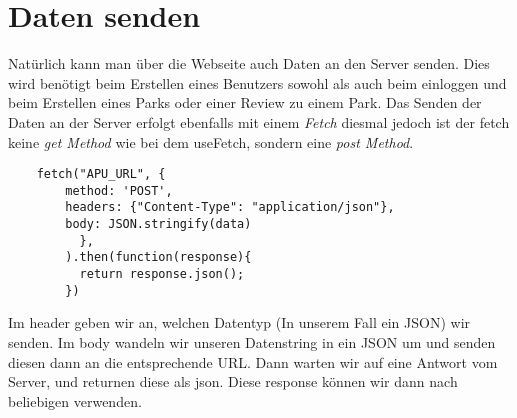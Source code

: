 \section{Daten senden}
\label{sendData}

Natürlich kann man über die Webseite auch Daten an den Server senden. Dies wird benötigt beim 
Erstellen eines Benutzers sowohl als auch beim einloggen und beim Erstellen eines Parks oder einer 
Review zu einem Park. Das Senden der Daten an der Server erfolgt ebenfalls mit einem \textit{Fetch}
diesmal jedoch ist der fetch keine \textit{get Method} wie bei dem useFetch, sondern eine 
\textit{post Method}.
\begin{lstlisting}
    fetch("APU_URL", {
        method: 'POST',
        headers: {"Content-Type": "application/json"},
        body: JSON.stringify(data)
          },
        ).then(function(response){
          return response.json();
        })
\end{lstlisting}

Im header geben wir an, welchen Datentyp (In unserem Fall ein JSON) wir senden. Im body wandeln wir 
unseren Datenstring in ein JSON um und senden diesen dann an die entsprechende URL. Dann warten wir 
auf eine Antwort vom Server, und returnen diese als json. Diese response können wir dann nach beliebigen 
verwenden.